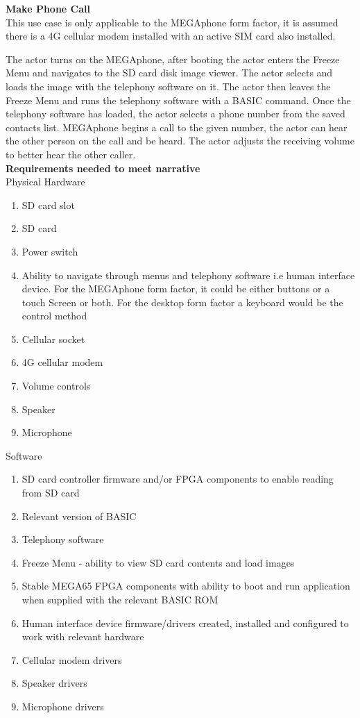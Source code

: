 \textbf{Make Phone Call}\\
This use case is only applicable to the MEGAphone form factor, it is assumed there is a 4G cellular modem installed with an active SIM card also installed.

The actor turns on the MEGAphone, after booting the actor enters the Freeze Menu and navigates to the SD card disk image viewer. The actor selects and loads the image with the telephony software on it. The actor then leaves the Freeze Menu and runs the telephony software with a BASIC command. Once the telephony software has loaded, the actor selects a phone number from the saved contacts list. MEGAphone begins a call to the given number, the actor can hear the other person on the call and be heard. The actor adjusts the receiving volume to better hear the other caller.\\

\textbf{Requirements needed to meet narrative}\\
Physical Hardware
\begin{enumerate}
\item SD card slot
\item SD card
\item Power switch
\item Ability to navigate through menus and telephony software i.e human interface device. For the MEGAphone form factor, it could be either buttons or a touch Screen or both. For the desktop form factor a keyboard would be the control method
\item Cellular socket
\item 4G cellular modem
\item Volume controls
\item Speaker
\item Microphone
\end{enumerate}

Software\\
\begin{enumerate}
\item SD card controller firmware and/or FPGA components to enable reading from SD card
\item Relevant version of BASIC 
\item Telephony software
\item Freeze Menu - ability to view SD card contents and load images
\item Stable MEGA65 FPGA components with ability to boot and run application when supplied with the relevant BASIC ROM
\item Human interface device firmware/drivers created, installed and configured to work with relevant hardware
\item Cellular modem drivers
\item Speaker drivers
\item Microphone drivers
\end{enumerate}

